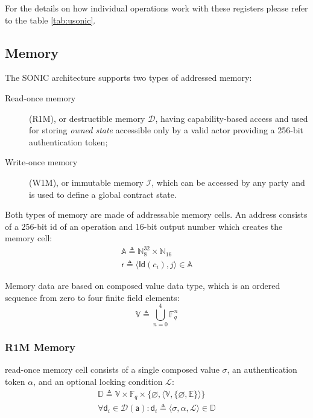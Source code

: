 \documentclass[9pt,oneside]{amsart}
\begin{document}
\begin{multicols}{2}
For the details on how individual operations work with these registers
please refer to the table \ref{tab:usonic}.

\subsection{Memory}\label{Memory}

The SONIC architecture supports two types of addressed memory:
\begin{description}
\item[Read-once memory] (R1M), or \gls{destructible memory} $\mathcal{D}$,
    having capability-based access and used for storing \emph{owned state}
    accessible only by a valid actor providing a 256-bit \gls{authentication token};

\item[Write-once memory] (W1M), or \gls{immutable memory} $\mathcal{I}$,
    which can be accessed by any party and is used to define a global contract state.
\end{description}

Both types of memory are made of addressable memory cells.
An address consists of a 256-bit id of an operation and 16-bit output number
which creates the memory cell:
\noindent
\begin{gather}
\mathbb{A} \triangleq \mathbb{N}^{32}_8 \times \mathbb{N}_{16} \\
\mathsf{r} \triangleq \langle \mathsf{Id}(c_i), j \rangle \in \mathbb{A}
\end{gather}

Memory data are based on \gls{composed value} data type,
which is an ordered sequence from zero to four finite field elements:
\noindent
\begin{equation}
\mathbb{V} \triangleq \bigcup_{n=0}^{4} \mathbb{F}_q^n
\end{equation}

\subsubsection{R1M Memory}\label{R1M}

\Gls{read-once memory} cell consists of a single \gls{composed value} $\sigma$,
an \gls{authentication token} $\alpha$, and an optional \gls{locking condition} $\mathcal{L}$:
\noindent
\begin{gather}
\mathbb{D} \triangleq \mathbb{V} \times \mathbb{F}_q \times \{ \varnothing, \langle \mathbb{V}, \{ \varnothing, \mathbb{E} \} \rangle \} \\
\forall \mathsf{d}_i \in \mathcal{D}(\mathsf{a}) : \mathsf{d}_i \triangleq \langle \sigma, \alpha, \mathcal{L} \rangle \in \mathbb{D}
\end{gather}


\end{multicols}
\end{document}
